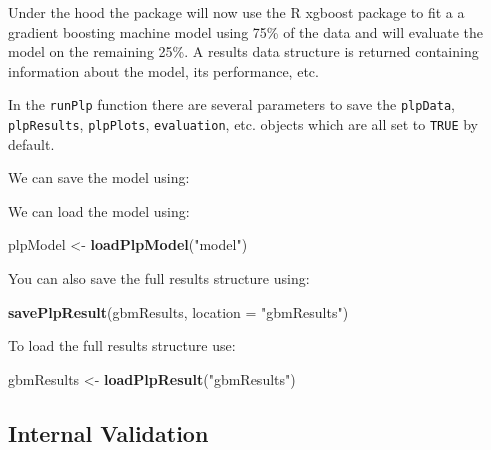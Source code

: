 \documentclass[11pt]{book}
\newenvironment{Shaded}{\begin{snugshade}}{\end{snugshade}}
\newcommand{\KeywordTok}[1]{\textcolor[rgb]{0.13,0.29,0.53}{\textbf{#1}}}
\newcommand{\DataTypeTok}[1]{\textcolor[rgb]{0.13,0.29,0.53}{#1}}
\newcommand{\StringTok}[1]{\textcolor[rgb]{0.31,0.60,0.02}{#1}}
\newcommand{\OperatorTok}[1]{\textcolor[rgb]{0.81,0.36,0.00}{\textbf{#1}}}
\newcommand{\NormalTok}[1]{#1}
\theoremstyle{definition}
\theoremstyle{definition}
\theoremstyle{definition}
\theoremstyle{remark}
\begin{document}
Under the hood the package will now use the R xgboost package to fit a a
gradient boosting machine model using 75\% of the data and will evaluate
the model on the remaining 25\%. A results data structure is returned
containing information about the model, its performance, etc.

In the \texttt{runPlp} function there are several parameters to save the
\texttt{plpData}, \texttt{plpResults}, \texttt{plpPlots},
\texttt{evaluation}, etc. objects which are all set to \texttt{TRUE} by
default.

We can save the model using:

\begin{Shaded}
\end{Shaded}

We can load the model using:

\begin{Shaded}
\begin{Highlighting}[]
\NormalTok{plpModel <-}\StringTok{ }\KeywordTok{loadPlpModel}\NormalTok{(}\StringTok{"model"}\NormalTok{)}
\end{Highlighting}
\end{Shaded}

You can also save the full results structure using:

\begin{Shaded}
\begin{Highlighting}[]
\KeywordTok{savePlpResult}\NormalTok{(gbmResults, }\DataTypeTok{location =} \StringTok{"gbmResults"}\NormalTok{)}
\end{Highlighting}
\end{Shaded}

To load the full results structure use:

\begin{Shaded}
\begin{Highlighting}[]
\NormalTok{gbmResults <-}\StringTok{ }\KeywordTok{loadPlpResult}\NormalTok{(}\StringTok{"gbmResults"}\NormalTok{)}
\end{Highlighting}
\end{Shaded}

\subsection{Internal Validation}\label{internal-validation}
\end{document}
